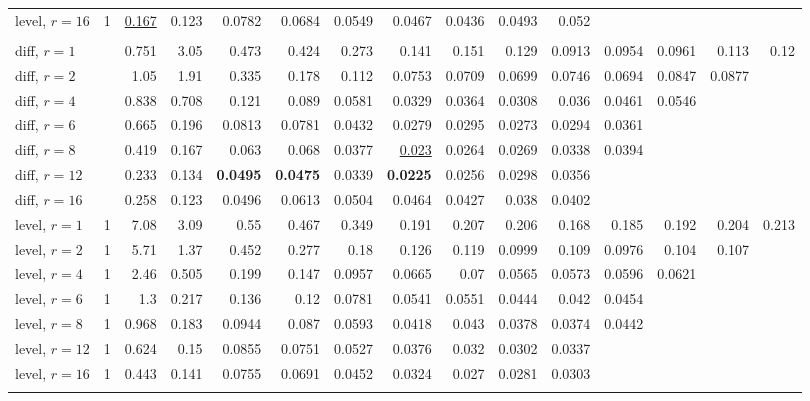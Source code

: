 \begin{table}[t]
\begin{tabular}{lrrrrrrrrrrrrrr}
\quad level, $r{=}16$ & 1 & \underline{0.167} & 0.123 & 0.0782 & 0.0684 & 0.0549 & 0.0467 & 0.0436 & 0.0493 & 0.052 &  &  &  &  \\
\addlinespace
\multicolumn{15}{l}{\textit{Chronos-2 L-syn}} \\
\quad diff, $r{=}1$ &  & 0.751 & 3.05 & 0.473 & 0.424 & 0.273 & 0.141 & 0.151 & 0.129 & 0.0913 & 0.0954 & 0.0961 & 0.113 & 0.12 \\
\quad diff, $r{=}2$ &  & 1.05 & 1.91 & 0.335 & 0.178 & 0.112 & 0.0753 & 0.0709 & 0.0699 & 0.0746 & 0.0694 & 0.0847 & 0.0877 &  \\
\quad diff, $r{=}4$ &  & 0.838 & 0.708 & 0.121 & 0.089 & 0.0581 & 0.0329 & 0.0364 & 0.0308 & 0.036 & 0.0461 & 0.0546 &  &  \\
\quad diff, $r{=}6$ &  & 0.665 & 0.196 & 0.0813 & 0.0781 & 0.0432 & 0.0279 & 0.0295 & 0.0273 & 0.0294 & 0.0361 &  &  &  \\
\quad diff, $r{=}8$ &  & 0.419 & 0.167 & 0.063 & 0.068 & 0.0377 & \underline{0.023} & 0.0264 & 0.0269 & 0.0338 & 0.0394 &  &  &  \\
\quad diff, $r{=}12$ &  & 0.233 & 0.134 & \textbf{0.0495} & \textbf{0.0475} & 0.0339 & \textbf{0.0225} & 0.0256 & 0.0298 & 0.0356 &  &  &  &  \\
\quad diff, $r{=}16$ &  & 0.258 & 0.123 & 0.0496 & 0.0613 & 0.0504 & 0.0464 & 0.0427 & 0.038 & 0.0402 &  &  &  &  \\
\quad level, $r{=}1$ & 1 & 7.08 & 3.09 & 0.55 & 0.467 & 0.349 & 0.191 & 0.207 & 0.206 & 0.168 & 0.185 & 0.192 & 0.204 & 0.213 \\
\quad level, $r{=}2$ & 1 & 5.71 & 1.37 & 0.452 & 0.277 & 0.18 & 0.126 & 0.119 & 0.0999 & 0.109 & 0.0976 & 0.104 & 0.107 &  \\
\quad level, $r{=}4$ & 1 & 2.46 & 0.505 & 0.199 & 0.147 & 0.0957 & 0.0665 & 0.07 & 0.0565 & 0.0573 & 0.0596 & 0.0621 &  &  \\
\quad level, $r{=}6$ & 1 & 1.3 & 0.217 & 0.136 & 0.12 & 0.0781 & 0.0541 & 0.0551 & 0.0444 & 0.042 & 0.0454 &  &  &  \\
\quad level, $r{=}8$ & 1 & 0.968 & 0.183 & 0.0944 & 0.087 & 0.0593 & 0.0418 & 0.043 & 0.0378 & 0.0374 & 0.0442 &  &  &  \\
\quad level, $r{=}12$ & 1 & 0.624 & 0.15 & 0.0855 & 0.0751 & 0.0527 & 0.0376 & 0.032 & 0.0302 & 0.0337 &  &  &  &  \\
\quad level, $r{=}16$ & 1 & 0.443 & 0.141 & 0.0755 & 0.0691 & 0.0452 & 0.0324 & 0.027 & 0.0281 & 0.0303 &  &  &  &  \\
\addlinespace

\end{tabular}
\end{table}
